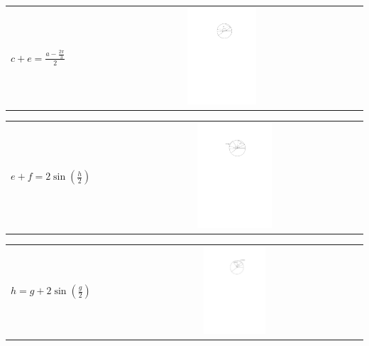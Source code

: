\documentclass[11pt]{article}
\begin{document}
\begin{center}
\begin{tabularx}{\textwidth}{lXc}
    \end{tabularx}
    \begin{tabularx}{\textwidth}{lXc}
        \hline
        \multirow{2}{*}{$c+e = \frac{a - \frac{2\pi}{3}}{2}$} & &  \parbox[c]{0.25\textwidth}{\includegraphics[width=0.25\textwidth]{Q2S1_Eq/eq_4.pdf}} \\
    \end{tabularx}
    \begin{tabularx}{\textwidth}{lXc}
        \hline
        \multirow{2}{*}{$e+f = 2\sin(\frac{h}{2})$} & & \parbox[c]{0.3\textwidth}{\includegraphics[width=0.3\textwidth]{Q2S1_Eq/eq_5.pdf}} \\
    \end{tabularx}
    \begin{tabularx}{\textwidth}{lXc}
        \hline
        \multirow{2}{*}{$h = g+2\sin(\frac{g}{2})$} & & \parbox[c]{0.25\textwidth}{\includegraphics[width=0.25\textwidth]{Q2S1_Eq/eq_6.pdf}} \\
    \end{tabularx}

\end{center}
\end{document}
